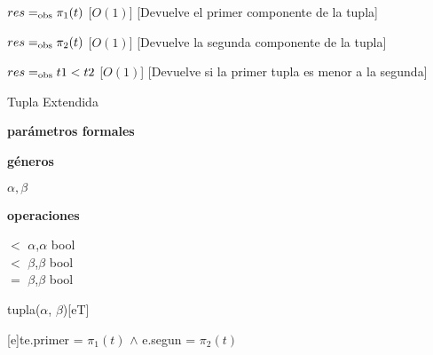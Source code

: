 \begin{Interfaz}
	{$res =_{\mathrm{obs}} \pi_1 (t)$}
	[$O(1)$]
	[Devuelve el primer componente de la tupla]

	{$res =_{\mathrm{obs}} \pi_2 (t)$}
	[$O(1)$]
	[Devuelve la segunda componente de la tupla]

	{$res =_{\mathrm{obs}} t1 < t2$}
	[$O(1)$]
	[Devuelve si la primer tupla es menor a la segunda]


	\begin{tad}{Tupla Extendida}
	\parskip=0pt

	\textbf{parámetros formales}\parindent\\
	\parbox{1.7cm}{\textbf{géneros}}$\alpha,\beta$\\
	\parbox{\parindent+1.7cm}{\textbf{operaciones}}\parbox[t]{\textwidth-\parindent-1.7cm}{
		\tadOperacionInline
		{\puntito $<$ \puntito}
		{$\alpha$,$\alpha$}
		{bool}\\
		\tadOperacionInline
		{\puntito $<$ \puntito}
		{$\beta$,$\beta$}
		{bool}\\
		\tadOperacionInline
		{\puntito $=$ \puntito}
		{$\beta$,$\beta$}
		{bool}
	}


	
	\tadAxiomas


	\end{tad}

\end{Interfaz}


\begin{Representacion}

	\begin{Estructura}{tupla($\alpha$, $\beta$)}[eT]
		\begin{Tupla}[eT]
		\end{Tupla}
	\end{Estructura}





	{t}{e.primer = $\pi_1 (t)$ $\land$ e.segun = $\pi_2 (t)$}
\end{Representacion}

